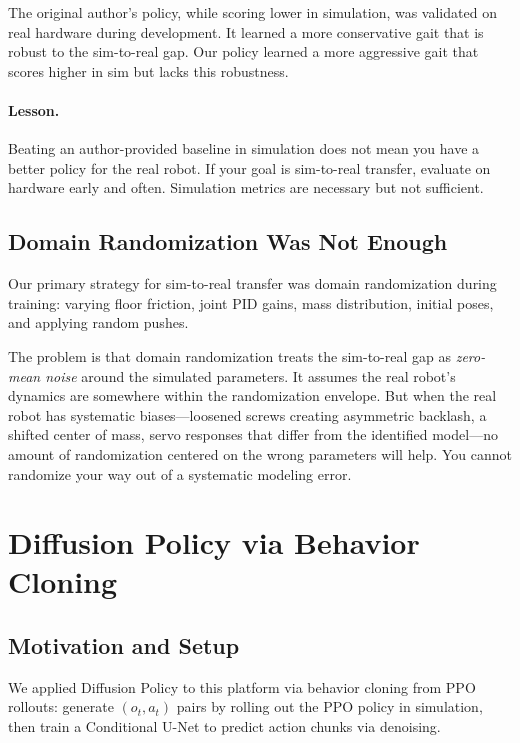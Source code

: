 \documentclass{article}
\begin{document}
The original author's policy, while scoring lower in simulation, was validated on real hardware during development. It learned a more conservative gait that is robust to the sim-to-real gap. Our policy learned a more aggressive gait that scores higher in sim but lacks this robustness.

\paragraph{Lesson.} Beating an author-provided baseline in simulation does not mean you have a better policy for the real robot. If your goal is sim-to-real transfer, evaluate on hardware early and often. Simulation metrics are necessary but not sufficient.


\subsection{Domain Randomization Was Not Enough}

Our primary strategy for sim-to-real transfer was domain randomization during training: varying floor friction, joint PID gains, mass distribution, initial poses, and applying random pushes.

The problem is that domain randomization treats the sim-to-real gap as \emph{zero-mean noise} around the simulated parameters. It assumes the real robot's dynamics are somewhere within the randomization envelope. But when the real robot has systematic biases---loosened screws creating asymmetric backlash, a shifted center of mass, servo responses that differ from the identified model---no amount of randomization centered on the wrong parameters will help. You cannot randomize your way out of a systematic modeling error.


\section{Diffusion Policy via Behavior Cloning}

\subsection{Motivation and Setup}

We applied Diffusion Policy \citep{chi2023diffusion} to this platform via behavior cloning from PPO rollouts: generate $(o_t, a_t)$ pairs by rolling out the PPO policy in simulation, then train a Conditional U-Net to predict action chunks via denoising.
\end{document}
